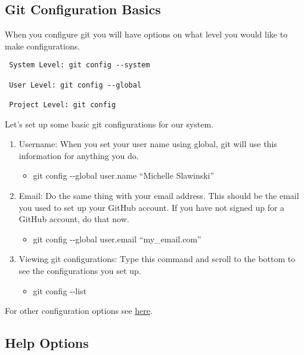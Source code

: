 \documentclass[
]{article}
\providecommand{\tightlist}{%
  \setlength{\itemsep}{0pt}\setlength{\parskip}{0pt}}
\begin{document}
\hypertarget{git-configuration-basics}{%
\subsection{Git Configuration Basics}\label{git-configuration-basics}}

When you configure git you will have options on what level you would
like to make configurations.

\begin{verbatim}
 System Level: git config --system

 User Level: git config --global

 Project Level: git config
\end{verbatim}

Let's set up some basic git configurations for our system.

\begin{enumerate}
\def\labelenumi{\arabic{enumi}.}
\tightlist
\item
  Username: When you set your user name using global, git will use this
  information for anything you do.

  \begin{itemize}
  \tightlist
  \item
    git config -\/-global user.name ``Michelle Slawinski''
  \end{itemize}
\item
  Email: Do the same thing with your email address. This should be the
  email you used to set up your GitHub account. If you have not signed
  up for a GitHub account, do that now.

  \begin{itemize}
  \tightlist
  \item
    git config -\/-global user.email ``my\_email.com''
  \end{itemize}
\item
  Viewing git configurations: Type this command and scroll to the bottom
  to see the configurations you set up.

  \begin{itemize}
  \tightlist
  \item
    git config -\/-list
  \end{itemize}
\end{enumerate}

For other configuration options see
\href{https://git-scm.com/docs/git-config}{here}.

\hypertarget{help-options}{%
\subsection{Help Options}\label{help-options}}
\end{document}

